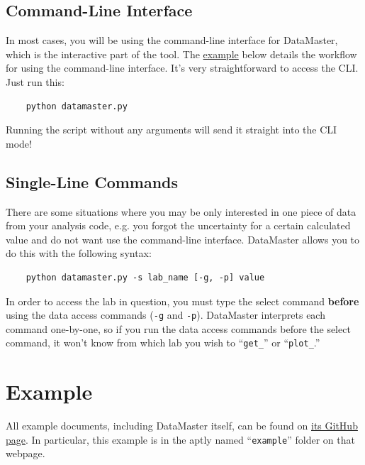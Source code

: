 \documentclass[12pt]{article}
\begin{document}
{\subsection*{Command-Line Interface}

In most cases, you will be using the command-line interface for DataMaster, which is the interactive part of the tool. The \hyperref[sec:example]{example} below details the workflow for using the command-line interface. It's very straightforward to access the CLI. Just run this:
\begin{framed}
  \begin{lstlisting}
    python datamaster.py
  \end{lstlisting}
\end{framed}
Running the script without any arguments will send it straight into the CLI mode!

\subsection*{Single-Line Commands}

There are some situations where you may be only interested in one piece of data from your analysis code, e.g. you forgot the uncertainty for a certain calculated value and do not want use the command-line interface. DataMaster allows you to do this with the following syntax:
\begin{framed}
  \begin{lstlisting}
    python datamaster.py -s lab_name [-g, -p] value
  \end{lstlisting}
\end{framed}
In order to access the lab in question, you must type the select command \textbf{before} using the data access commands (\texttt{-g} and \texttt{-p}). DataMaster interprets each command one-by-one, so if you run the data access commands before the select command, it won't know from which lab you wish to ``\texttt{get\_}'' or ``\texttt{plot\_}.''

\section*{Example}
\label{sec:example}

All example documents, including DataMaster itself, can be found on \href{https://github.com/nyuphys/DataMaster/}{its GitHub page}. In particular, this example is in the aptly named ``\texttt{example}'' folder on that webpage.

}
\end{document}
